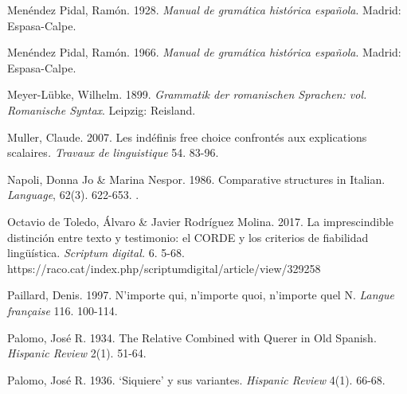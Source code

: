 \begin{styleStandard}
Menéndez Pidal, Ramón. 1928. \textit{Manual de gramática histórica española}. Madrid: Espasa-Calpe.
\end{styleStandard}

\begin{styleStandard}
Menéndez Pidal, Ramón. 1966. \textit{Manual de gramática histórica española}. Madrid: Espasa-Calpe.
\end{styleStandard}

\begin{styleStandard}
Meyer-Lübke, Wilhelm. 1899. \textit{Grammatik der romanischen Sprachen: vol. Romanische Syntax}. Leipzig: Reisland.
\end{styleStandard}

\begin{styleStandard}
Muller, Claude. 2007. Les indéfinis free choice confrontés aux explications scalaires\textit{. Travaux de linguistique} 54. 83-96.
\end{styleStandard}

\begin{styleStandard}
Napoli, Donna Jo \& Marina Nespor. 1986. Comparative structures in Italian. \textit{Language}, 62(3). 622-653. \href{http://doi.org/10.1353/lan.1986.0060}{}.
\end{styleStandard}

\begin{styleStandard}
Octavio de Toledo, Álvaro \& Javier Rodríguez Molina. 2017. La imprescindible distinción entre texto y testimonio: el CORDE y los criterios de fiabilidad lingüística. \textit{Scriptum digital.} 6. 5-68. https://raco.cat/index.php/scriptumdigital/article/view/329258
\end{styleStandard}

\begin{styleStandard}
Paillard, Denis. 1997. N’importe qui, n’importe quoi, n’importe quel N. \textit{Langue française} 116. 100-114.
\end{styleStandard}

\begin{styleStandard}
Palomo, José R. 1934. The Relative Combined with Querer in Old Spanish. \textit{Hispanic Review} 2(1). 51-64. 
\end{styleStandard}

\begin{styleStandard}
Palomo, José R. 1936. ‘Siquiere’ y sus variantes. \textit{Hispanic Review} 4(1). 66-68.
\end{styleStandard}

